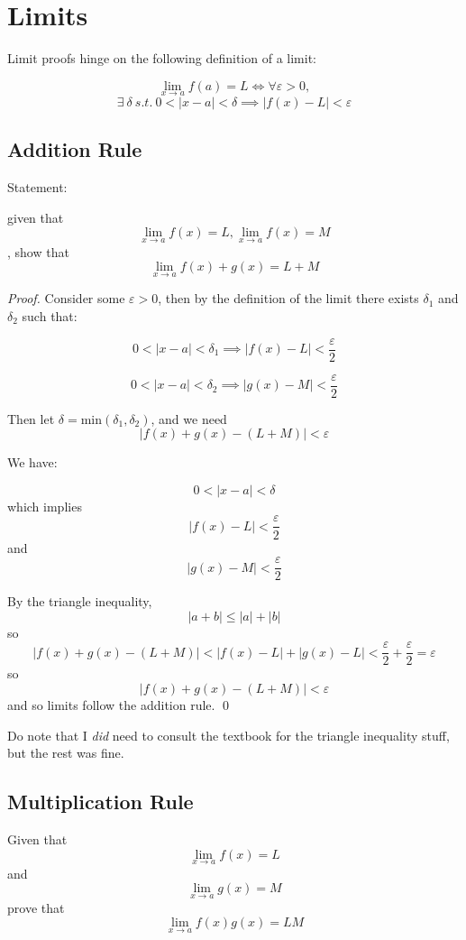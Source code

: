 \clearpage
\section{Limits}

Limit proofs hinge on the following definition of a limit:

\[\lim_{x \to a} f(a) = L \iff \forall \varepsilon > 0, \]
\[\exists\ \delta\ s.t.\ 0 < |x - a| < \delta \implies |f(x) - L| < \varepsilon\]


\subsection{Addition Rule}

Statement:

given that 
\[\lim_{x \to a} f(x) = L, \lim_{x \to a} f(x) = M\], show that
\[\lim_{x \to a} f(x) + g(x) = L + M\]

\begin{proof}
Consider some $\varepsilon > 0$, then by the definition of the limit there exists $\delta_1$ and $\delta_2$ such that:

\[0 < |x - a| < \delta_1 \implies |f(x) - L| < \frac{\varepsilon}{2}\]

\[0 < |x - a| < \delta_2 \implies |g(x) - M| < \frac{\varepsilon}{2}\]

Then let $\delta = \text{min}(\delta_1, \delta_2)$, and we need
\[|f(x) + g(x) - (L + M)| < \varepsilon\]

We have:

\[0 < |x - a| < \delta\]
which implies
\[|f(x) - L| < \frac{\varepsilon}{2}\]
and
\[|g(x) - M| < \frac{\varepsilon}{2}\]

By the triangle inequality, 
\[|a + b| \leq |a| + |b|\]
so
\[|f(x) + g(x) - (L + M)| < |f(x) - L| + |g(x) - L| < \frac{\varepsilon}{2} + \frac{\varepsilon}{2} = \varepsilon\]
so
\[|f(x) + g(x) - (L + M)| < \varepsilon\]
and so limits follow the addition rule.
\qed
\end{proof}

Do note that I \emph{did} need to consult the textbook for the triangle inequality stuff, but the rest was fine.

\subsection{Multiplication Rule}
Given that
\[\lim_{x \to a} f(x) = L\]
and
\[\lim_{x \to a} g(x) = M\]
prove that
\[\lim_{x \to a} f(x)g(x) = LM\]

